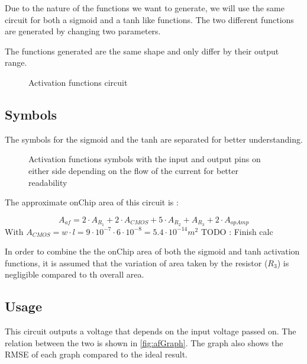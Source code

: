 Due to the nature of the functions we want to generate, we will use the same circuit for both a sigmoid and a \ac{tanh} like functions. The two different functions are generated by changing two parameters.

The functions generated are the same shape and only differ by their output range.

\begin{figure}[H]
  \centering
  
  \caption{Activation functions circuit}
  \label{circt:af}
\end{figure}

\subsection{Symbols}
The symbols for the sigmoid and the \ac{tanh} are separated for better understanding.

\begin{figure}[H]
  \centering
  \hspace*{0.8cm}
  \hfill
  \hspace*{0.8cm}
  \caption{Activation functions symbols with the input and output pins on either side depending on the flow of the current for better readability}
  \label{fig:afSymbol}
\end{figure}

The approximate onChip area of this circuit is :

\begin{equation}
  A_{af}=2\cdot A_{R_1} + 2\cdot A_{CMOS} + 5\cdot A_{R_2} + A_{R_3} +2\cdot A_{opAmp}
\end{equation}
With $A_{CMOS} = w\cdot l = 9\cdot 10^{-7} \cdot 6 \cdot 10^{-8} = 5.4 \cdot 10^{-14} m^2$
TODO : Finish calc

In order to combine the the onChip area of both the sigmoid and \ac{tanh} activation functions, it is assumed that the variation of area taken by the resistor ($R_3$) is negligible compared to th overall area.

\subsection{Usage}

This circuit outputs a voltage that depends on the input voltage passed on. The relation between the two is shown in \cref{fig:afGraph}. The graph also shows the \ac{RMSE} of each graph compared to the ideal result.

